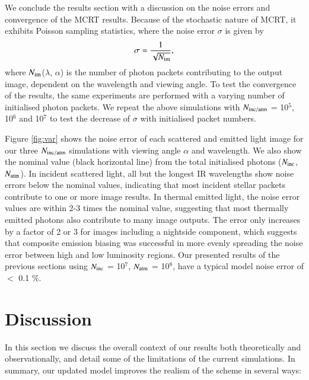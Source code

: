 \documentclass{aa}
\begin{document}
We conclude the results section with a discussion on the noise errors and convergence of the MCRT results. 
Because of the stochastic nature of MCRT, it exhibits Poisson sampling statistics, where the noise error $\sigma$ is given by 
\begin{equation}
\sigma = \frac{1}{\sqrt{N_{\rm im}}} ,
\label{eq:var}
\end{equation}
where $N_{\rm im}$($\lambda$, $\alpha$) is the number of photon packets contributing to the output image, dependent on the wavelength and viewing angle.
To test the convergence of the results, the same experiments are performed with a varying number of initialised photon packets. 
We repeat the above simulations with $N_{\rm inc/atm}$ = 10$^{5}$, 10$^{6}$ and 10$^{7}$  to test the decrease of $\sigma$ with initialised packet numbers.

Figure \ref{fig:var} shows the noise error of each scattered and emitted light image for our three $N_{\rm inc/atm}$ simulations with viewing angle $\alpha$ and wavelength.
We also show the nominal value (black horizontal line) from the total initialised photons ($N_{\rm inc}$, $N_{\rm atm}$). 
In incident scattered light, all but the longest IR wavelengths show noise errors below the nominal values, indicating that most incident stellar packets contribute to one or more image results.
In thermal emitted light, the noise error values are within 2-3 times the nominal value, suggesting that most thermally emitted photons also contribute to many image outputs.
The error only increases by a factor of 2 or 3 for images including a nightside component, which suggests that composite emission biasing was successful in more evenly spreading the noise error between high and low luminosity regions.
Our presented results of the previous sections using $N_{\rm inc}$ = 10$^{7}$, $N_{\rm atm}$ = 10$^{8}$, have a typical model noise error of $<$ 0.1 $\%$.

\section{Discussion}
\label{sec:Discussion}

In this section we discuss the overall context of our results both theoretically and observationally, and detail some of the limitations of the current simulations.
In summary, our updated model improves the realism of the \citet{Hood2008} scheme in several ways:
\end{document}
